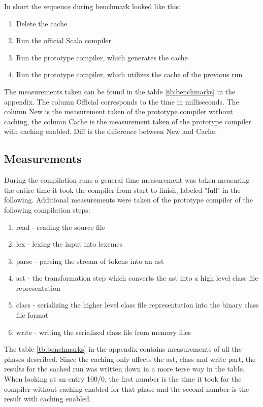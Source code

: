 \documentclass{VUMIFPSbakalaurinis}
\begin{document}
In short the sequence during benchmark looked like this:

\begin{enumerate}
\item{Delete the cache}
\item{Run the official Scala compiler}
\item{Run the prototype compiler, which generates the cache}
\item{Run the prototype compiler, which utilizes the cache of the previous run}
\end{enumerate}

The measurements taken can be found in the table \ref{tb:benchmarks} in the appendix.
The column Official corresponds to the time in milliseconds.
The column New is the measurement taken of the prototype compiler without caching, the column Cache is the measurement taken of the prototype compiler with caching enabled.
Diff is the difference between New and Cache.

\subsection{Measurements}

During the compilation runs a general time measurement was taken measuring the entire time it took the compiler from start to finish, labeled "full" in the following.
Additional measurements were taken of the prototype compiler of the following compilation steps:

\begin{enumerate}
\item{read - reading the source file}
\item{lex - lexing the input into lexemes}
\item{parse - parsing the stream of tokens into an ast}
\item{ast - the transformation step which converts the ast into a high level class file representation}
\item{class - serializing the higher level class file representation into the binary class file format}
\item{write - writing the serialized class file from memory files}
\end{enumerate}


The table \ref{tb:benchmarks} in the appendix contains measurements of all the phases described.
Since the caching only affects the ast, class and write part, the results for the cached run was written down in a more terse way in the table.
When looking at an entry 100/0, the first number is the time it took for the compiler without caching enabled for that phase and the second number is the result with caching enabled.
\end{document}
